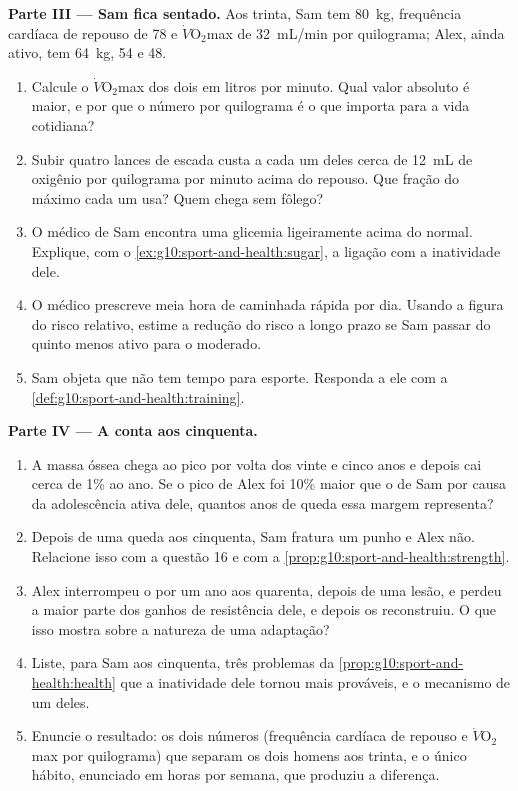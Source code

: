 \begin{problem}
\medskip
\noindent\textbf{Parte III --- Sam fica sentado.}
Aos trinta, Sam tem \qty{80}{kg}, frequência cardíaca de repouso de 78
e $\dot V\!\mathrm{O_2}$max de \qty{32}{mL/min} por quilograma; Alex,
ainda ativo, tem \qty{64}{kg}, 54 e \num{48}.
\begin{enumerate}[resume]
  \item Calcule o $\dot V\!\mathrm{O_2}$max dos dois em litros por
        minuto. Qual valor absoluto é maior, e por que o número por
        quilograma é o que importa para a vida cotidiana?
  \item Subir quatro lances de escada custa a cada um deles cerca de
        \qty{12}{mL} de oxigênio por quilograma por minuto acima do
        repouso. Que fração do máximo cada um usa? Quem chega sem
        fôlego?
  \item O médico de Sam encontra uma glicemia ligeiramente acima do
        normal. Explique, com o \cref{ex:g10:sport-and-health:sugar}, a
        ligação com a inatividade dele.
  \item O médico prescreve meia hora de caminhada rápida por dia.
        Usando a figura do risco relativo, estime a redução do risco a
        longo prazo se Sam passar do quinto menos ativo para o
        moderado.
  \item Sam objeta que não tem tempo para esporte. Responda a ele com a
        \cref{def:g10:sport-and-health:training}.
\end{enumerate}

\medskip
\noindent\textbf{Parte IV --- A conta aos cinquenta.}
\begin{enumerate}[resume]
  \item A massa óssea chega ao pico por volta dos vinte e cinco anos e
        depois cai cerca de 1\% ao ano. Se o pico de Alex foi 10\%
        maior que o de Sam por causa da adolescência ativa dele,
        quantos anos de queda essa margem representa?
  \item Depois de uma queda aos cinquenta, Sam fratura um punho e Alex
        não. Relacione isso com a questão 16 e com a
        \cref{prop:g10:sport-and-health:strength}.
  \item Alex interrompeu o  por um ano aos quarenta, depois
        de uma lesão, e perdeu a maior parte dos ganhos de resistência
        dele, e depois os reconstruiu. O que isso mostra sobre a
        natureza de uma adaptação?
  \item Liste, para Sam aos cinquenta, três problemas da
        \cref{prop:g10:sport-and-health:health} que a inatividade dele
        tornou mais prováveis, e o mecanismo de um deles.
  \item Enuncie o resultado: os dois números (frequência cardíaca de
        repouso e $\dot V\!\mathrm{O_2}$max por quilograma) que separam
        os dois homens aos trinta, e o único hábito, enunciado em horas
        por semana, que produziu a diferença.
\end{enumerate}
\end{problem}
